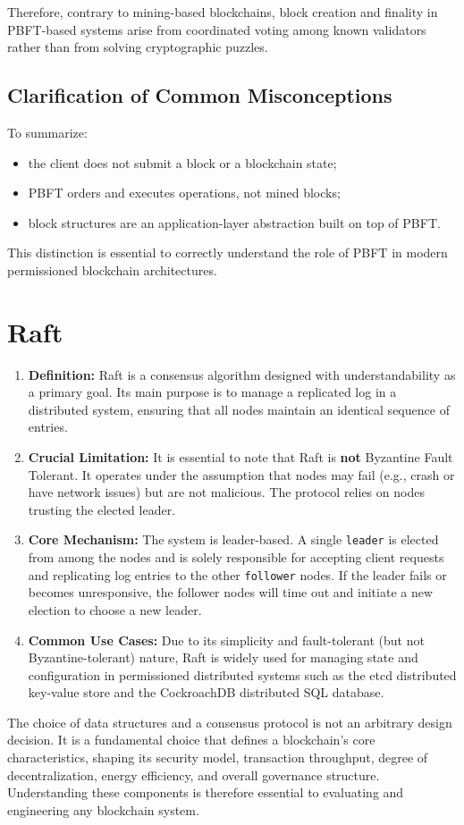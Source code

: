 \documentclass{scrbook}
\begin{document}
Therefore, contrary to mining-based blockchains, block creation and finality in PBFT-based
systems arise from coordinated voting among known validators rather than from solving
cryptographic puzzles.

\subsection{Clarification of Common Misconceptions}

To summarize:
\begin{itemize}
    \item the client does not submit a block or a blockchain state;
    \item PBFT orders and executes operations, not mined blocks;
    \item block structures are an application-layer abstraction built on top of PBFT.
\end{itemize}

This distinction is essential to correctly understand the role of PBFT in modern permissioned blockchain architectures.

\section{Raft}

\begin{enumerate}
    \item \textbf{Definition:} Raft is a consensus algorithm designed with understandability as a primary goal. Its main purpose is to manage a replicated log in a distributed system, ensuring that all nodes maintain an identical sequence of entries.
    \item \textbf{Crucial Limitation:} It is essential to note that Raft is \textbf{not} Byzantine Fault Tolerant. It operates under the assumption that nodes may fail (e.g., crash or have network issues) but are not malicious. The protocol relies on nodes trusting the elected leader.
    \item \textbf{Core Mechanism:} The system is leader-based. A single \texttt{leader} is elected from among the nodes and is solely responsible for accepting client requests and replicating log entries to the other \texttt{follower} nodes. If the leader fails or becomes unresponsive, the follower nodes will time out and initiate a new election to choose a new leader.
    \item \textbf{Common Use Cases:} Due to its simplicity and fault-tolerant (but not Byzantine-tolerant) nature, Raft is widely used for managing state and configuration in permissioned distributed systems such as the etcd distributed key-value store and the CockroachDB distributed SQL database.
\end{enumerate}

The choice of data structures and a consensus protocol is not an arbitrary design decision. It is a fundamental choice that defines a blockchain's core characteristics, shaping its security model, transaction throughput, degree of decentralization, energy efficiency, and overall governance structure. Understanding these components is therefore essential to evaluating and engineering any blockchain system.
\end{document}
